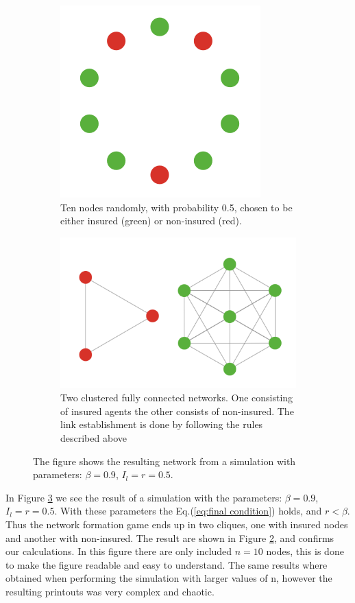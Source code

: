 \begin{figure}[h]
\centering
\begin{subfigure}{.5\textwidth}
  \centering
  \includegraphics[width=0.4\linewidth]{../Figures/FirstSimulationStart.png}
  \caption{\label{fig:firstsimulation:a} Ten nodes randomly, with probability 0.5, chosen to be either insured (green) or non-insured (red).}
\end{subfigure}
\quad
\begin{subfigure}{.46\textwidth}
  \centering
  \includegraphics[width=0.8\linewidth]{../Figures/FirstSimulationResult.png}
  \caption{\label{fig:firstsimulation:b} Two clustered fully connected networks. One consisting of insured agents the other consists of non-insured. The link establishment is done by following the rules described above}
\end{subfigure}
\caption{\label{fig:firstsimulation} The figure shows the resulting network from a simulation with parameters: $\beta=0.9$, $I_{l}=r=0.5$.}
\end{figure}
In Figure \ref{fig:firstsimulation} we see the result of a simulation with the parameters: $\beta=0.9$, $I_{l}=r=0.5$. With these parameters the Eq.(\ref{eq:final condition}) holds, and $r<\beta$. Thus the network formation game ends up in two cliques, one with insured nodes and another with non-insured. The result are shown in Figure \ref{fig:firstsimulation:b}, and confirms our calculations.
In this figure there are only included $n=10$ nodes, this is done to make the figure readable and easy to understand.
The same results where obtained when performing the simulation with larger values of n, however the resulting printouts was very complex and chaotic.

